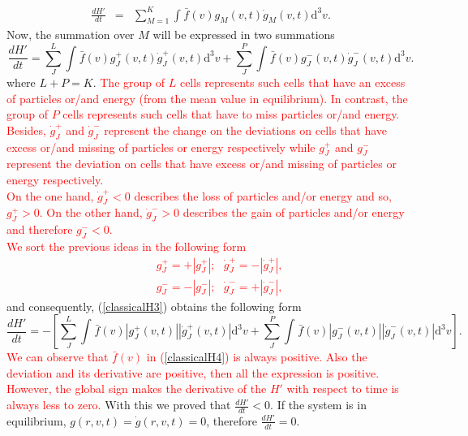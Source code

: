 \documentclass{article}
\begin{document}
\begin{eqnarray}
\frac{dH'}{dt}&=&\sum_{M=1}^{K}\int_{}^{}\bar f(v)g_M(v,t)\dot g_M(v,t)\mathrm{d}^3v.
\end{eqnarray}
Now, the summation over $M$ will be expressed in two summations
\begin{equation}
    \frac{dH'}{dt}=\sum_J^{L}\int_{}^{}\bar f(v)g_J^{+}(v,t)\dot g_J^{+}(v,t)\mathrm{d}^3v +\sum_J^{P}\int_{}^{}\bar f(v)g_J^{-}(v,t)\dot g_J^{-}(v,t)\mathrm{d}^3v. \label{classicalH3}
\end{equation}
where $L+P=K$. \textcolor{red}{The group of $L$ cells represents such cells that have an excess of particles or/and energy (from the mean value in equilibrium). In contrast, the group of $P$ cells represents such cells that have to miss particles or/and energy. Besides, $\dot{g}^{+}_{J}$ and $\dot{g}^{-}_{J}$  represent the change on the deviations on cells that have excess or/and missing of particles or energy respectively while $g^{+}_{J}$ and $g^{-}_{J}$ represent the deviation on cells that have excess or/and missing of particles or energy respectively.\\
On the one hand, $\dot{g}^{+}_{J}<0$ describes the loss of particles and/or energy and so, $g^{+}_{J}>0$. On the other hand, $\dot{g}^{-}_{J}>0$ describes the gain of particles and/or energy and therefore $g^{-}_{J}<0$. \\
We sort the previous ideas in the following form
\begin{eqnarray}
   &&g^{+}_{J}=+|g^{+}_{J}|; \ \ \  \dot{g}^{+}_{J}=-|\dot{g}^{+}_{J}|, \nonumber \\
   &&g^{-}_{J}=-|g^{-}_{J}|; \ \ \ \dot{g}^{-}_{J}=+|\dot{g}^{-}_{J}| \label{separacionclassical},
\end{eqnarray}}
and consequently, (\ref{classicalH3}) obtains the following form
\begin{equation}
    \frac{dH'}{dt}=-\left[
                               \sum_J^{L}\int_{}^{}\bar f(v)|g_J^{+}(v,t)||\dot g_J^{+}(v,t)|\mathrm{d}^3v +\sum_J^{P}\int_{}^{}\bar f(v)|g_J^{-}(v,t)||\dot g_J^{-}(v,t)|\mathrm{d}^3v 
    \right]. \label{classicalH4}
\end{equation}
\textcolor{red}{We can observe that $\bar{f}(v)$ in (\ref{classicalH4}) is always positive. Also the deviation and its derivative are positive, then all the expression is positive. However, the global sign makes the derivative of the $H'$ with respect to time is always less to zero.} With this we proved that $\frac{dH'}{dt}<0$. If the system is in equilibrium, $g(r,v,t)=\dot g(r,v,t)=0$, therefore $\frac{dH'}{dt}=0$.\\
\end{document}
